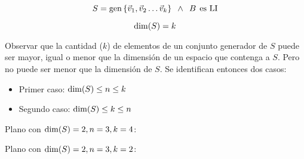 \begin{mdframed}[style=DefinitionFrame]
    \begin{defn}
    \end{defn}
    \begin{equation*}
        S = \operatorname{gen}{ \left\{ {\Vec{v}_1, \Vec{v}_2 \dots \Vec{v}_k} \right\} }
        \enspace \land \enspace
        B \hspace{1ex} \textrm{es LI}
    \end{equation*}
\end{mdframed}

\begin{mdframed}[style=DefinitionFrame]
    \begin{defn}
    \end{defn}
    \begin{equation*}
        \operatorname{dim}(S) = k
    \end{equation*}
\end{mdframed}

Observar que la cantidad ($k$) de elementos de un conjunto generador de $S$ puede ser mayor, igual o menor que la dimensión de un espacio que contenga a $S$.
Pero no puede ser menor que la dimensión de $S$.
Se identifican entonces dos casos:
\begin{itemize}
    \item Primer caso: $\operatorname{dim}(S) \leq n \leq k$
    \item Segundo caso: $\operatorname{dim}(S) \leq k \leq n$
\end{itemize}

\begin{mdframed}[style=ExampleFrame]
    \begin{example}
    \end{example}
    Plano con $\operatorname{dim}(S)=2, n=3, k=4$:

    \begin{center}
        \def\svgwidth{0.6\linewidth}
        
    \end{center}

    Plano con $\operatorname{dim}(S)=2, n=3, k=2$:

    \begin{center}
        \def\svgwidth{0.6\linewidth}
        
    \end{center}
\end{mdframed}

